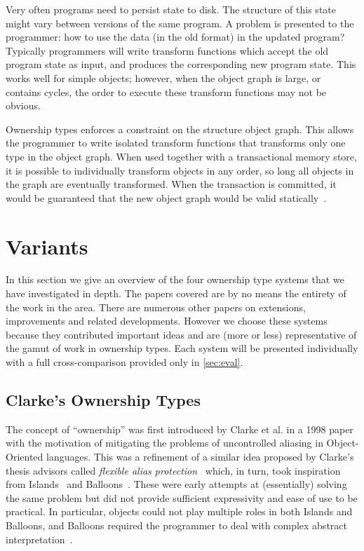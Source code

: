 \documentclass{acm_proc_article-sp}
\begin{document}
Very often programs need to persist state to disk. The structure of this state 
might vary between versions of the same program. A problem is presented to the 
programmer: how to use the data (in the old format) in the updated program? 
Typically programmers will write transform functions which accept the old 
program state as input, and produces the corresponding new program state. This 
works well for simple objects; however, when the object graph is large, or 
contains cycles, the order to execute these transform functions may not be 
obvious.

Ownership types enforces a constraint on the structure object graph. This 
allows the programmer to write isolated transform functions that transforms 
only one type in the object graph. When used together with a transactional 
memory store, it is possible to individually transform objects in any order, so 
long all objects in the graph are eventually transformed. When the transaction 
is committed, it would be guaranteed that the new object graph would be 
valid statically~\cite{boyapati04safejava,boyapati03innerclass}.

\section{Variants}
\label{sec:variants}

In this section we give an overview of the four ownership type systems that we
have investigated in depth. The papers covered are by no means the entirety of
the work in the area. There are numerous other papers on extensions,
improvements and related developments. However we choose these systems because
they contributed important ideas and are (more or less) representative of the
gamut of work in ownership types. Each system will be presented individually
with a full cross-comparison provided only in \cref{sec:eval}.

\subsection{Clarke's Ownership Types}
\label{subsec:clarke}

The concept of ``ownership'' was first introduced by Clarke et al. in a 1998
paper~\cite{clarke98ownership} with the motivation of mitigating the problems
of uncontrolled aliasing in Object-Oriented languages. This was a refinement of
a similar idea proposed by Clarke's thesis advisors called \emph{flexible alias
protection}~\cite{noble98alias} which, in turn, took inspiration from
Islands~\cite{hogg91islands} and Balloons~\cite{almeida97balloons}. These were
early attempts at (essentially) solving the same problem but did not provide
sufficient expressivity and ease of use to be practical. In particular, objects
could not play multiple roles in both Islands and Balloons, and Balloons
required the programmer to deal with complex abstract
interpretation~\cite{noble98alias}.
\end{document}
